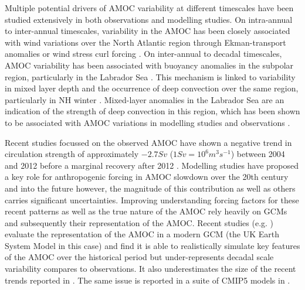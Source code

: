 Multiple potential drivers of AMOC variability at different timescales have been studied extensively in both observations and modelling studies. On intra-annual to inter-annual timescales, variability in the AMOC has been closely associated with wind variations over the North Atlantic region through Ekman-transport anomalies or wind stress curl forcing \citep{wangCharacteristic2019b, mccarthyObserved2012b, mielkeObserved2013b, yangLocal2015b}. On inter-annual to decadal timescales, AMOC variability has been associated with buoyancy anomalies in the subpolar region, particularly in the Labrador Sea \citep{delworthInterdecadal1993b, medhaugMechanisms2012b}. This mechanism is linked to variability in mixed layer depth and the occurrence of deep convection over the same region, particularly in NH winter \citep{boningDecadal2006c, biastochCauses2008c, robsonCauses2012c, wangVariability2015b}. Mixed-layer anomalies in the Labrador Sea are an indication of the strength of deep convection in this region, which has been shown to be associated with AMOC variations in modelling studies \citep{edenMechanism2001b, edenNorth2001b} and observations \citep{latifPerspective2011b}.

Recent studies focussed on the observed AMOC have shown a negative trend in circulation strength of approximately $-2.7 Sv$ ($1 Sv = 10^6 m^3 s^{-1}$) between 2004 and 2012 \citep{smeedNorth2018b} before a marginal recovery after 2012 \citep{smeedAtlantic2019c}. Modelling studies have proposed a key role for anthropogenic forcing in AMOC slowdown over the 20th century and into the future \citep{liuOverlooked2017a, bakkerFate2016b, liuMechanisms2019b} however, the magnitude of this contribution as well as others carries significant uncertainties. Improving understanding forcing factors for these recent patterns as well as the true nature of the AMOC rely heavily on GCMs and subsequently their representation of the AMOC. Recent studies (e.g. \cite{robsonEvaluation2020d}) evaluate the representation of the AMOC in a modern GCM (the UK Earth System Model in this case) and find it is able to realistically simulate key features of the AMOC over the historical period but under-represents decadal scale variability compares to observations. It also underestimates the size of the recent trends reported in \cite{smeedNorth2018b, smeedAtlantic2019c}. The same issue is reported in a suite of CMIP5 models in \cite{roberts20042014}.

